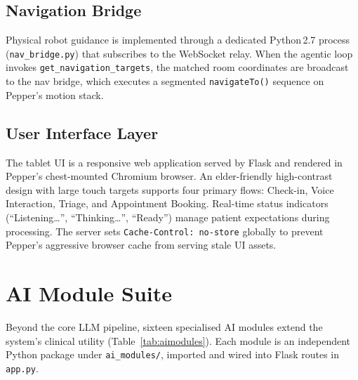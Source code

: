 \documentclass[conference]{IEEEtran}
\begin{document}
\subsection{Navigation Bridge}

Physical robot guidance is implemented through a dedicated Python\,2.7 process
(\texttt{nav\_bridge.py}) that subscribes to the WebSocket relay.
When the agentic loop invokes \texttt{get\_navigation\_targets}, the matched
room coordinates are broadcast to the nav bridge, which executes a segmented
\texttt{navigateTo()} sequence on Pepper's motion stack.

\subsection{User Interface Layer}

The tablet UI is a responsive web application served by Flask and rendered in
Pepper's chest-mounted Chromium browser.
An elder-friendly high-contrast design with large touch targets supports four
primary flows: Check-in, Voice Interaction, Triage, and Appointment Booking.
Real-time status indicators (``Listening…'', ``Thinking…'', ``Ready'') manage
patient expectations during processing.
The server sets \texttt{Cache-Control:\,no-store} globally to prevent Pepper's
aggressive browser cache from serving stale UI assets.

\section{AI Module Suite}
\label{sec:aimodules}

Beyond the core LLM pipeline, sixteen specialised AI modules extend the
system's clinical utility (Table~\ref{tab:aimodules}).
Each module is an independent Python package under
\texttt{ai\_modules/}, imported and wired into Flask routes in \texttt{app.py}.
\end{document}

